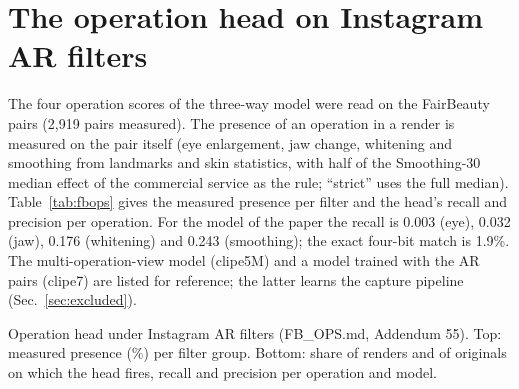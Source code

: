 \documentclass[10pt]{article}
\begin{document}
\section{The operation head on Instagram AR filters}
\label{sec:fbops}
The four operation scores of the three-way model were read on the FairBeauty pairs (2,919 pairs measured). The presence of an
operation in a render is measured on the pair itself (eye enlargement, jaw change, whitening and smoothing from landmarks and
skin statistics, with half of the Smoothing-30 median effect of the commercial service as the rule; ``strict'' uses the full
median). Table~\ref{tab:fbops} gives the measured presence per filter and the head's recall and precision per operation. For
the model of the paper the recall is 0.003 (eye), 0.032 (jaw), 0.176 (whitening) and 0.243 (smoothing); the exact four-bit
match is 1.9\%. The multi-operation-view model (clipe5M) and a model trained with the AR pairs (clipe7) are listed for
reference; the latter learns the capture pipeline (Sec.~\ref{sec:excluded}).
\begin{table}[H]
\centering
\caption{Operation head under Instagram AR filters (FB\_OPS.md, Addendum 55). Top: measured presence (\%) per filter group.
Bottom: share of renders and of originals on which the head fires, recall and precision per operation and model.}
\label{tab:fbops}
\scriptsize
\begin{adjustbox}{max width=\linewidth}\end{adjustbox}\\[4pt]
\begin{adjustbox}{max width=\linewidth}\end{adjustbox}
\end{table}
\end{document}
